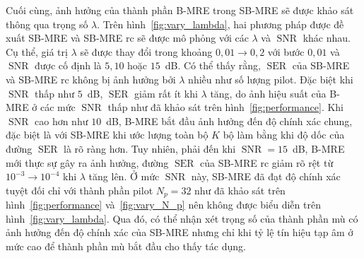 Cuối cùng, ảnh hưởng của thành phần B-MRE trong SB-MRE sẽ được khảo sát thông qua trọng số $\lambda$. Trên hình~\ref{fig:vary_lambda}, hai phương pháp được đề xuất SB-MRE và SB-MRE rc sẽ được mô phỏng với các $\lambda$ và $\operatorname{SNR}$ khác nhau. Cụ thể, giá trị $\lambda$ sẽ được thay đổi trong khoảng $0,01 \rightarrow 0,2$ với bước $0,01$ và $\operatorname{SNR}$ được cố định là $5, 10$ hoặc $15$~dB. Có thể thấy rằng, $\operatorname{SER}$ của SB-MRE và SB-MRE rc không bị ảnh hưởng bởi $\lambda$ nhiều như số lượng pilot. Đặc biệt khi $\operatorname{SNR}$ thấp như $5$~dB, $\operatorname{SER}$ giảm rất ít khi $\lambda$ tăng, do ảnh hiệu suất của B-MRE ở các mức $\operatorname{SNR}$ thấp như đã khảo sát trên hình~\ref{fig:performance}. Khi $\operatorname{SNR}$ cao hơn như $10$~dB, B-MRE bắt đầu ảnh hưởng đến độ chính xác chung, đặc biệt là với SB-MRE khi ước lượng toàn bộ $K$ bộ làm bằng khi độ dốc của đường $\operatorname{SER}$ là rõ ràng hơn. Tuy nhiên, phải đến khi $\operatorname{SNR}=15$~dB, B-MRE mới thực sự gây ra ảnh hưởng, đường $\operatorname{SER}$ của SB-MRE rc giảm rõ rệt từ $10^{-3} \rightarrow 10^{-4}$ khi $\lambda$ tăng lên. Ở mức $\operatorname{SNR}$ này, SB-MRE đã đạt độ chính xác tuyệt đối chỉ với thành phần pilot $N_p = 32$ như đã khảo sát trên hình~\ref{fig:performance} và~\ref{fig:vary_N_p} nên không được biểu diễn trên hình~\ref{fig:vary_lambda}. Qua đó, có thể nhận xét trọng số của thành phần mù có ảnh hưởng đến độ chính xác của SB-MRE nhưng chỉ khi tỷ lệ tín hiệu tạp âm ở mức cao để thành phần mù bắt đầu cho thấy tác dụng.

